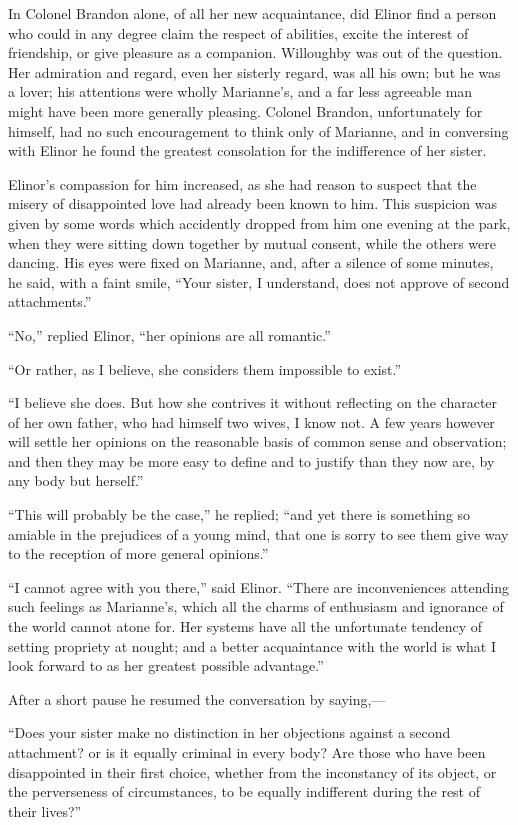 In Colonel Brandon alone, of all her new acquaintance,
did Elinor find a person who could in any degree claim the
respect of abilities, excite the interest of friendship,
or give pleasure as a companion.  Willoughby was out
of the question.  Her admiration and regard, even her
sisterly regard, was all his own; but he was a lover;
his attentions were wholly Marianne's, and a far less
agreeable man might have been more generally pleasing.
Colonel Brandon, unfortunately for himself, had no such
encouragement to think only of Marianne, and in conversing
with Elinor he found the greatest consolation for the
indifference of her sister.

Elinor's compassion for him increased, as she had reason
to suspect that the misery of disappointed love had already
been known to him.  This suspicion was given by some words
which accidently dropped from him one evening at the park,
when they were sitting down together by mutual consent,
while the others were dancing.  His eyes were fixed
on Marianne, and, after a silence of some minutes,
he said, with a faint smile, ``Your sister, I understand,
does not approve of second attachments.''

``No,'' replied Elinor, ``her opinions are all romantic.''

``Or rather, as I believe, she considers them
impossible to exist.''

``I believe she does.  But how she contrives it
without reflecting on the character of her own father,
who had himself two wives, I know not.  A few years
however will settle her opinions on the reasonable basis
of common sense and observation; and then they may be
more easy to define and to justify than they now are,
by any body but herself.''

``This will probably be the case,'' he replied;
``and yet there is something so amiable in the prejudices
of a young mind, that one is sorry to see them give way
to the reception of more general opinions.''

``I cannot agree with you there,'' said Elinor.
``There are inconveniences attending such feelings
as Marianne's, which all the charms of enthusiasm and
ignorance of the world cannot atone for.  Her systems have
all the unfortunate tendency of setting propriety at nought;
and a better acquaintance with the world is what I look
forward to as her greatest possible advantage.''

After a short pause he resumed the conversation
by saying,---%

``Does your sister make no distinction in her objections
against a second attachment? or is it equally criminal
in every body?  Are those who have been disappointed
in their first choice, whether from the inconstancy
of its object, or the perverseness of circumstances,
to be equally indifferent during the rest of their lives?''

